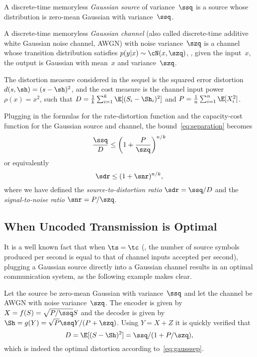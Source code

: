 \begin{definition}
  \label{def:gaussiansc}
  A discrete-time memoryless \emph{Gaussian source} of variance~$\ssq$ is a
  source whose distribution is zero-mean Gaussian with variance~$\ssq$.

  A discrete-time memoryless \emph{Gaussian channel} (also called discrete-time
  additive white Gaussian noise channel, AWGN) with noise variance~$\szq$ is a
  channel whose transition distribution satisfies $p(y|x) \sim \cN(x, \szq)$,
  \ie, given the input~$x$, the output is Gaussian with mean~$x$ and
  variance~$\szq$.
\end{definition}

The distortion measure considered in the sequel is the squared error distortion
$d(s,\sh) = (s - \sh)^2$, and the cost measure is the channel input power
$\rho(x) = x^2$, such that $D = \frac1k \sum_{i=1}^k \E[(S_i - \Sh_i)^2]$ and $P
= \frac1n \sum_{i=1}^n \E[X_i^2]$.

Plugging in the formulas for the rate-distortion function and the capacity-cost
function for the Gaussian source and channel, the bound~\eqref{eq:separation}
becomes
\begin{equation}
  \label{eq:gausssep}
  \frac{\ssq}{D} \le \left( 1 + \frac{P}{\szq} \right)^{n/k}
\end{equation}
or equivalently
\begin{equation}
  \label{eq:gausssepsdr}
  \sdr \le (1 + \snr)^{n/k},
\end{equation}
where we have defined the \emph{source-to-distortion ratio} $\sdr = \ssq/D$ and
the \emph{signal-to-noise ratio} $\snr = P/\szq$. 


\subsection{When Uncoded Transmission is Optimal}

It is a well known fact that when $\ts = \tc$ (\ie, the number of source symbols
produced per second is equal to that of channel inputs accepted per second),
plugging a Gaussian source directly into a Gaussian channel results in an
optimal communication system, as the following example makes clear.

\begin{example}
  \label{ex:gausssingle}
  Let the source be zero-mean Gaussian with variance~$\ssq$ and let the channel
  be AWGN with noise variance~$\szq$. The encoder is given by $X =
  f(S) = \sqrt{P/\ssq} S$ and the decoder is given by $\Sh = g(Y) = \sqrt{P}
  \ssq Y / (P + \szq)$. Using $Y = X + Z$ it is quickly verified that
  \begin{equation*}
    D = \E[(S - \Sh)^2] = \ssq / (1 + P/\szq),
  \end{equation*}
  which is indeed the optimal distortion according to~\eqref{eq:gausssep}.
\end{example}


